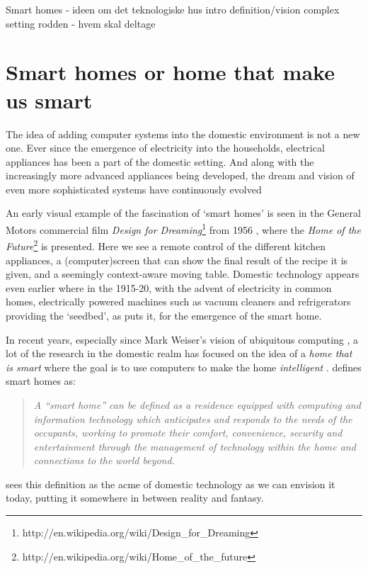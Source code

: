 Smart homes - ideen om det teknologiske hus
intro
definition/vision
complex setting
rodden - hvem skal deltage 

\section{Smart homes or home that make us smart}
The idea of adding computer systems into the domestic environment is not a new one.
Ever since the emergence of electricity into the households, electrical appliances has been a part of the domestic setting.
And along with the increasingly more advanced appliances being developed, the dream and vision of even more sophisticated systems have continuously evolved

An early visual example of the fascination of `smart homes' is seen in the General Motors commercial film \emph{Design for Dreaming}\footnote{http://en.wikipedia.org/wiki/Design\_for\_Dreaming} from 1956 \citep{designfordreaming}, where the \emph{Home of the Future}\footnote{http://en.wikipedia.org/wiki/Home\_of\_the\_future} is presented.
Here we see a remote control of the different kitchen appliances, a (computer)screen that can show the final result of the recipe it is given, and a seemingly context-aware moving table.
Domestic technology appears even earlier where in the 1915-20, with the advent of electricity in common homes, electrically powered machines such as vacuum cleaners and refrigerators providing the `seedbed', as \citet{aldrich2003smart} puts it, for the emergence of the smart home.

In recent years, especially since Mark Weiser's vision of ubiquitous computing \citep{weiser1991computer}, a lot of the research in the domestic realm has focused on the idea of a \emph{home that is smart} where the goal is to use computers to make the home \emph{intelligent} \citep{taylor2007homes}.
\citet{aldrich2003smart} defines smart homes as:

\begin{quotation}
\emph{A ``smart home'' can be defined as a residence equipped with computing and information technology which anticipates and responds to the needs of the occupants, working to promote their comfort, convenience, security and entertainment through the management of technology within the home and connections to the world beyond.}
\end{quotation}
\citeauthor{aldrich2003smart} sees this definition as the acme of domestic technology as we can envision it today, putting it somewhere in between reality and fantasy.

